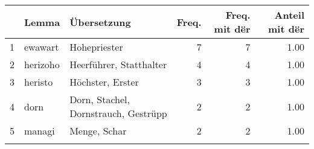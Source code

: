 \begin{tabular}{rllrrr}
  \lsptoprule
 & Lemma & Übersetzung & Freq. & Freq. mit dër & Anteil mit dër \\ 
  \midrule
1 & ewawart & Hohepriester &   7 &   7 & 1.00 \\ 
  2 & herizoho & Heerführer, Statthalter &   4 &   4 & 1.00 \\ 
  3 & heristo & Höchster, Erster &   3 &   3 & 1.00 \\ 
  4 & dorn & Dorn, Stachel, Dornstrauch, Gestrüpp &   2 &   2 & 1.00 \\ 
  5 & managi & Menge, Schar &   2 &   2 & 1.00 \\ 
   \lspbottomrule
\end{tabular}
